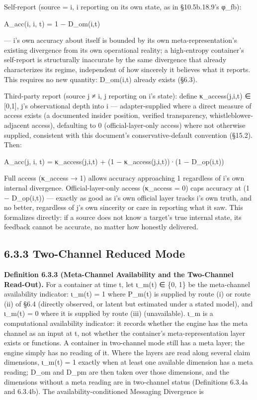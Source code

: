 \documentclass[
]{article}
\begin{document}
Self-report (source = i, i reporting on its own state, as in
§10.5b.18.9's φ\_fb):

A\_acc(i, i, t) = 1 − D\_om(i,t)

--- i's own accuracy about itself is bounded by its own
meta-representation's existing divergence from its own operational
reality; a high-entropy container's self-report is structurally
inaccurate by the same divergence that already characterizes its regime,
independent of how sincerely it believes what it reports. This requires
no new quantity: D\_om(i,t) already exists (§6.3).

Third-party report (source j ≠ i, j reporting on i's state): define
κ\_access(j,i,t) ∈ {[}0,1{]}, j's observational depth into i ---
adapter-supplied where a direct measure of access exists (a documented
insider position, verified transparency, whistleblower-adjacent access),
defaulting to 0 (official-layer-only access) where not otherwise
supplied, consistent with this document's conservative-default
convention (§15.2). Then:

A\_acc(j, i, t) = κ\_access(j,i,t) + (1 − κ\_access(j,i,t))·(1 −
D\_op(i,t))

Full access (κ\_access → 1) allows accuracy approaching 1 regardless of
i's own internal divergence. Official-layer-only access (κ\_access = 0)
caps accuracy at (1 − D\_op(i,t)) --- exactly as good as i's own
official layer tracks i's own truth, and no better, regardless of j's
own sincerity or care in reporting what it saw. This formalizes
directly: if a source does not know a target's true internal state, its
feedback cannot be accurate, no matter how honestly delivered.

\hypertarget{two-channel-reduced-mode}{%
\subsection{6.3.3 Two-Channel Reduced
Mode}\label{two-channel-reduced-mode}}

\textbf{Definition 6.3.3 (Meta-Channel Availability and the Two-Channel
Read-Out).} For a container at time t, let ι\_m(t) ∈ \{0, 1\} be the
meta-channel availability indicator: ι\_m(t) = 1 where P\_m(t) is
supplied by route (i) or route (ii) of §6.4 (directly observed, or
latent but estimated under a stated model), and ι\_m(t) = 0 where it is
supplied by route (iii) (unavailable). ι\_m is a computational
availability indicator: it records whether the engine has the meta
channel as an input at t, not whether the container's
meta-representation layer exists or functions. A container in
two-channel mode still has a meta layer; the engine simply has no
reading of it. Where the layers are read along several claim dimensions,
ι\_m(t) = 1 exactly when at least one available dimension has a meta
reading; D\_om and D\_pm are then taken over those dimensions, and the
dimensions without a meta reading are in two-channel status (Definitions
6.3.4a and 6.3.4b). The availability-conditioned Messaging Divergence is
\end{document}
